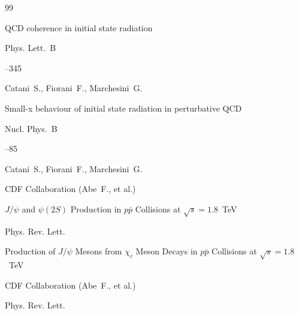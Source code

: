 \begin{thebibliography}{99}

\paper QCD coherence in initial state radiation


\jour Phys. Lett.~B 



--345

\by Catani~S., Fiorani~F., Marchesini~G.







\paper Small-x behaviour of initial state radiation in perturbative QCD


\jour Nucl. Phys.~B 



--85

\by  Catani~S.,  Fiorani~F.,  Marchesini~G.






\by  CDF Collaboration (Abe~F., et al.)

\paper $J/\psi$ and $\psi(2S)$ Production in $p\bar p$  Collisions at ${\sqrt s=1.8}$~TeV

\jour Phys. Rev. Lett. 








\paper Production of $J/\psi$ Mesons from $\chi_c$ Meson Decays in $p\bar p$ Collisions at $\sqrt s=1.8$~TeV


\by  CDF Collaboration (Abe~F., et al.)

\jour Phys. Rev. Lett. 








\end{thebibliography}
